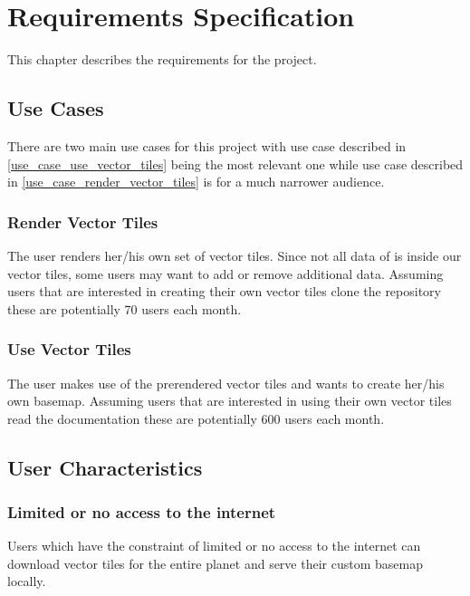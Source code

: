 \chapter{Requirements Specification}\label{requirements_specification}

This chapter describes the requirements for the project.

\section{Use Cases}\label{use_cases}

There are two main use cases for this project with use case described in \autoref{use_case_use_vector_tiles} being the most relevant one while use case described in \autoref{use_case_render_vector_tiles} is for a much narrower audience.

\subsection{Render Vector Tiles}\label{use_case_render_vector_tiles}

The user renders her/his own set of vector tiles. Since not all data of \osm{} is inside our vector tiles, some users may want to add or remove additional data. Assuming users that are interested in creating their own vector tiles clone the \osmvt{} repository these are potentially 70 users each month.

\subsection{Use Vector Tiles}\label{use_case_use_vector_tiles}

The user makes use of the prerendered vector tiles and wants to create her/his own basemap. Assuming users that are interested in using their own vector tiles read the documentation these are potentially 600 users each month.

\section{User Characteristics}\label{user_characteristics}

\subsection{Limited or no access to the internet}

Users which have the constraint of limited or no access to the internet can download vector tiles for the entire planet and serve their custom basemap locally.

